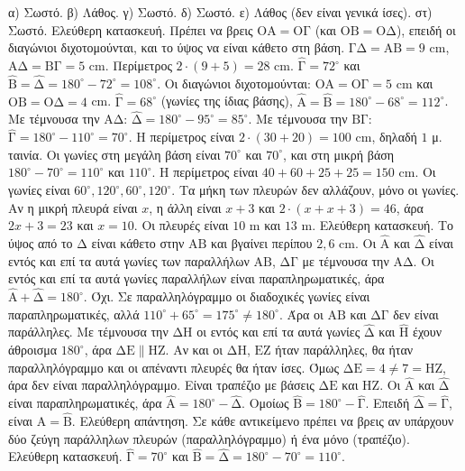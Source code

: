  α) Σωστό. β) Λάθος. γ) Σωστό. δ) Σωστό. ε) Λάθος (δεν είναι γενικά ίσες). στ) Σωστό.
 Ελεύθερη κατασκευή. Πρέπει να βρεις $\mathrm{ΟΑ}=\mathrm{ΟΓ}$ (και $\mathrm{ΟΒ}=\mathrm{ΟΔ}$), επειδή οι διαγώνιοι διχοτομούνται, και το ύψος να είναι κάθετο στη βάση.
 $\mathrm{ΓΔ}=\mathrm{ΑΒ}=9$ cm, $\mathrm{ΑΔ}=\mathrm{ΒΓ}=5$ cm. Περίμετρος $2\cdot(9+5)=28$ cm.
 $\hat{\mathrm{Γ}}=72^\circ$ και $\hat{\mathrm{Β}}=\hat{\mathrm{Δ}}=180^\circ-72^\circ=108^\circ$.
 Οι διαγώνιοι διχοτομούνται: $\mathrm{ΟΑ}=\mathrm{ΟΓ}=5$ cm και $\mathrm{ΟΒ}=\mathrm{ΟΔ}=4$ cm.
 $\hat{\mathrm{Γ}}=68^\circ$ (γωνίες της ίδιας βάσης), $\hat{\mathrm{Α}}=\hat{\mathrm{Β}}=180^\circ-68^\circ=112^\circ$.
 Με τέμνουσα την $\mathrm{ΑΔ}$: $\hat{\mathrm{Δ}}=180^\circ-95^\circ=85^\circ$. Με τέμνουσα την $\mathrm{ΒΓ}$: $\hat{\mathrm{Γ}}=180^\circ-110^\circ=70^\circ$.
 Η περίμετρος είναι $2\cdot(30+20)=100$ cm, δηλαδή $1$ μ. ταινία.
 Οι γωνίες στη μεγάλη βάση είναι $70^\circ$ και $70^\circ$, και στη μικρή βάση $180^\circ-70^\circ=110^\circ$ και $110^\circ$. Η περίμετρος είναι $40+60+25+25=150$ cm.
 Οι γωνίες είναι $60^\circ,120^\circ,60^\circ,120^\circ$. Τα μήκη των πλευρών δεν αλλάζουν, μόνο οι γωνίες.
 Αν η μικρή πλευρά είναι $x$, η άλλη είναι $x+3$ και $2\cdot(x+x+3)=46$, άρα $2x+3=23$ και $x=10$. Οι πλευρές είναι $10$ m και $13$ m.
 Ελεύθερη κατασκευή. Το ύψος από το $\mathrm{Δ}$ είναι κάθετο στην $\mathrm{ΑΒ}$ και βγαίνει περίπου $2{,}6$ cm.
 Οι $\hat{\mathrm{Α}}$ και $\hat{\mathrm{Δ}}$ είναι εντός και επί τα αυτά γωνίες των παραλλήλων $\mathrm{ΑΒ}$, $\mathrm{ΔΓ}$ με τέμνουσα την $\mathrm{ΑΔ}$. Οι εντός και επί τα αυτά γωνίες παραλλήλων είναι παραπληρωματικές, άρα $\hat{\mathrm{Α}}+\hat{\mathrm{Δ}}=180^\circ$.
 Όχι. Σε παραλληλόγραμμο οι διαδοχικές γωνίες είναι παραπληρωματικές, αλλά $110^\circ+65^\circ=175^\circ\neq180^\circ$. Άρα οι $\mathrm{ΑΒ}$ και $\mathrm{ΔΓ}$ δεν είναι παράλληλες.
 Με τέμνουσα την $\mathrm{ΔΗ}$ οι εντός και επί τα αυτά γωνίες $\hat{\mathrm{Δ}}$ και $\hat{\mathrm{Η}}$ έχουν άθροισμα $180^\circ$, άρα $\mathrm{ΔΕ}\parallel\mathrm{ΗΖ}$. Αν και οι $\mathrm{ΔΗ}$, $\mathrm{ΕΖ}$ ήταν παράλληλες, θα ήταν παραλληλόγραμμο και οι απέναντι πλευρές θα ήταν ίσες. Όμως $\mathrm{ΔΕ}=4\neq7=\mathrm{ΗΖ}$, άρα δεν είναι παραλληλόγραμμο. Είναι τραπέζιο με βάσεις $\mathrm{ΔΕ}$ και $\mathrm{ΗΖ}$.
 Οι $\hat{\mathrm{Α}}$ και $\hat{\mathrm{Δ}}$ είναι παραπληρωματικές, άρα $\hat{\mathrm{Α}}=180^\circ-\hat{\mathrm{Δ}}$. Ομοίως $\hat{\mathrm{Β}}=180^\circ-\hat{\mathrm{Γ}}$. Επειδή $\hat{\mathrm{Δ}}=\hat{\mathrm{Γ}}$, είναι $\hat{\mathrm{Α}}=\hat{\mathrm{Β}}$.
 Ελεύθερη απάντηση. Σε κάθε αντικείμενο πρέπει να βρεις αν υπάρχουν δύο ζεύγη παράλληλων πλευρών (παραλληλόγραμμο) ή ένα μόνο (τραπέζιο).
 Ελεύθερη κατασκευή. $\hat{\mathrm{Γ}}=70^\circ$ και $\hat{\mathrm{Β}}=\hat{\mathrm{Δ}}=180^\circ-70^\circ=110^\circ$.
